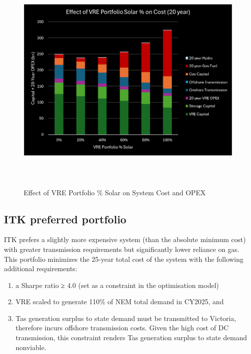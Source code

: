 \documentclass[
  letterpaper,
  DIV=11,
  numbers=noendperiod]{scrartcl}
\begin{document}
\begin{figure}[H]

{\centering \includegraphics[width=6.12083in,height=4.44722in]{./media/media/image15.png}

}

\caption{Effect of VRE Portfolio \% Solar on System Cost and OPEX}

\end{figure}%

\subsection{ITK preferred portfolio}\label{itk-preferred-portfolio}

ITK prefers a slightly more expensive system (than the absolute minimum
cost) with greater transmission requirements but significantly lower
reliance on gas. This portfolio minimizes the 25-year total cost of the
system with the following additional requirements:

\begin{enumerate}
\def\labelenumi{\arabic{enumi}.}
\item
  a Sharpe ratio ≥ 4.0 (set as a constraint in the optimisation model)
\item
  VRE scaled to generate 110\% of NEM total demand in CY2025, and
\item
  Tas generation surplus to state demand must be transmitted to
  Victoria, therefore incurs offshore transmission costs. Given the high
  cost of DC transmission, this constraint renders Tas generation
  surplus to state demand nonviable.
\end{enumerate}
\end{document}
